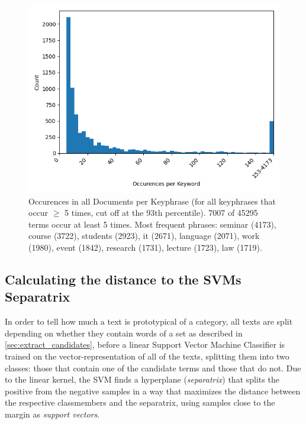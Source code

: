 \begin{figure}[H]
	\centering
	\includegraphics[width=\figwidth]{graphics/figures/keyphrases_histogram.png}
	\caption[Occurences in all Documents per Keyphrase]{
		\label{fig:keyphrases_histogram}
		Occurences in all Documents per Keyphrase (for all keyphrases that occur $\geq$ 5 times, cut off at the 93th percentile).
		7007 of 45295 terms occur at least 5 times.
		Most frequent phrases: seminar (4173), course (3722), students (2923), it (2671), language (2071), work (1980), event (1842), research (1731), lecture (1723), law (1719).
		}
\end{figure}


\subsection{Calculating the distance to the SVMs Separatrix}
\label{sec:calculate_distance}

In order to tell how much a text is prototypical of a category, all texts are split depending on whether they contain words of a set as described in \ref{sec:extract_candidates}, before a linear Support Vector Machine Classifier is trained on the vector-representation of all of the texts, splitting them into two classes: those that contain one of the candidate terms and those that do not. Due to the linear kernel, the SVM finds a hyperplane (\textit{separatrix}) that splits the positive from the negative samples in a way that maximizes the distance between the respective classmembers and the separatrix, using samples close to the margin as \textit{support vectors}. %

